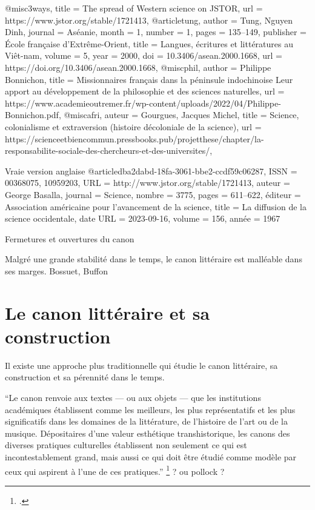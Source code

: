 @misc{3ways,
	title = {{The spread of Western science on JSTOR}},
	url = {https://www.jstor.org/stable/1721413},
}
@article{tung,
	author = {Tung, Nguyen Dinh},
	journal = {Aséanie},
	month = {1},
	number = {1},
	pages = {135--149},
	publisher = {École française d'Extrême-Orient},
	title = {{Langues, écritures et littératures au Viêt-nam}},
	volume = {5},
	year = {2000},
	doi = {10.3406/asean.2000.1668},
	url = {https://doi.org/10.3406/asean.2000.1668},
}
@misc{phil,
	author = {Philippe Bonnichon},
	title = {{Missionnaires français dans la péninsule indochinoise
Leur apport au développement de la philosophie et des sciences naturelles}},
	url = {https://www.academieoutremer.fr/wp-content/uploads/2022/04/Philippe-Bonnichon.pdf},
}
@misc{afri,
auteur = {Gourgues, Jacques Michel},
title = {{Science, colonialisme et extraversion (histoire décoloniale de la science)}},
url = {https://scienceetbiencommun.pressbooks.pub/projetthese/chapter/la-responsabilite-sociale-des-chercheurs-et-des-universites/},
}



Vraie version anglaise
@article{dba2dabd-18fa-3061-bbe2-ccdf59c06287,
  ISSN = {00368075, 10959203},
  URL = {http://www.jstor.org/stable/1721413},
  auteur = {George Basalla},
  journal = {Science},
  nombre = {3775},
  pages = {611--622},
  éditeur = {Association américaine pour l'avancement de la science},
  title = {La diffusion de la science occidentale},
  date URL = {2023-09-16},
  volume = {156},
  année = {1967}
}




















Fermetures et ouvertures du canon

Malgré une grande stabilité dans le temps, le canon littéraire est malléable dans ses marges. Bossuet, Buffon


\section{Le canon littéraire et sa construction}

Il existe une approche plus traditionnelle qui étudie le canon littéraire, sa construction et sa pérennité dans le temps. 


\enquote{Le canon renvoie aux textes — ou aux objets — que les institutions académiques établissent comme les meilleurs, les plus représentatifs et les plus significatifs dans les domaines de la littérature, de l’histoire de l’art ou de la musique. Dépositaires d’une valeur esthétique transhistorique, les canons des diverses pratiques culturelles établissent non seulement ce qui est incontestablement grand, mais aussi ce qui doit être étudié comme modèle par ceux qui aspirent à l’une de ces pratiques.}
\footcites{harder_deconstruire_2013} ? ou pollock ?


